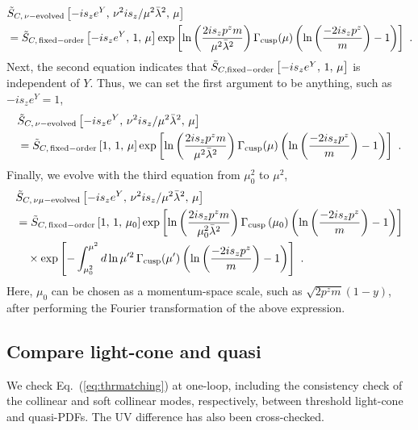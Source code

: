 \documentclass[a4paper,11pt]{article}
\begin{document}
\begin{align}
&\tilde{S}_{C,\,{\rm \nu-evolved}}\left[-i s_z e^{Y}, \, \nu^2 i s_z / \mu^2 \bar{\lambda}^2, \, \mu\right] \nonumber\\
&=\tilde{S}_{C,\,{\rm fixed-order}}\left[-i s_z e^{Y}, \, 1, \, \mu\right] \exp\left[ \ln\left( \frac{ 2 i s_z p^z m }{ \mu^2 \bar{\lambda}^2 } \right) \Gamma_{\rm cusp}(\mu)  \left(\ln\left(\frac{-2 i s_z p^z}{m}\right) - 1\right) \right] \ .
\end{align}
Next, the second equation indicates that $\tilde{S}_{C,{\rm fixed-order}}\left[-i s_z e^{Y}, \, 1, \, \mu\right]$ is independent of $Y$. Thus, we can set the first argument to be anything, such as $-i s_z e^{Y}=1$,
\begin{align}
&\tilde{S}_{C,\,{\rm \nu-evolved}}\left[-i s_z e^{Y}, \, \nu^2 i s_z / \mu^2 \bar{\lambda}^2, \, \mu\right]  \nonumber\\
&=\tilde{S}_{C,\,{\rm fixed-order}}\left[1, \, 1, \, \mu\right] \exp\left[ \ln\left( \frac{ 2 i s_z p^z m }{ \mu^2 \bar{\lambda}^2 } \right) \Gamma_{\rm cusp}(\mu)  \left(\ln\left(\frac{-2 i s_z p^z}{m}\right) - 1\right) \right] \ .
\end{align}
Finally, we evolve with the third equation from $\mu_0^2$ to $\mu^2$,
\begin{align}
&\tilde{S}_{C,\, {\rm \nu \mu-evolved}}\left[-i s_z e^{Y}, \, \nu^2 i s_z / \mu^2 \bar{\lambda}^2, \, \mu\right] \nonumber\\
&=\tilde{S}_{C,\,{\rm fixed-order}}\left[1, \, 1, \, \mu_0\right] \exp\left[ \ln\left( \frac{ 2 i s_z p^z m }{ \mu_0^2 \bar{\lambda}^2 } \right) \Gamma_{\rm cusp}\left(\mu_0\right) \left(\ln\left(\frac{-2 i s_z p^z}{m}\right) - 1\right) \right]    \nonumber\\
&\quad \times \exp\left[ - \int^{\mu^2}_{\mu_0^2} d \ln\mu'^2 \, \Gamma_{\rm cusp}(\mu') \left(  \ln\left(\frac{-2 i s_z p^z}{m}\right) - 1 \right)  \right] \ .
\end{align}
Here, $\mu_0$ can be chosen as a momentum-space scale, such as $\sqrt{2 p^z m}(1-y)$, after performing the Fourier transformation of the above expression.
\fi



\subsection{Compare light-cone and quasi}\label{sec:1loopfmlcq}
We check Eq.~(\ref{eq:thrmatching}) at one-loop, including the consistency check of the collinear and soft collinear modes, respectively, between threshold light-cone and quasi-PDFs. The UV difference has also been cross-checked. 
\end{document}
